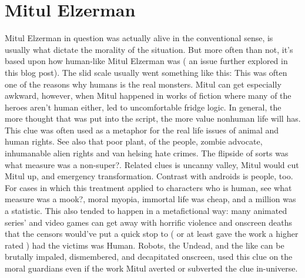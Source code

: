 \documentclass[12pt]{book}
\begin{document}
\chapter{Mitul Elzerman}

Mitul Elzerman in question was actually alive in the conventional sense, is usually what dictate the morality of the situation. But more often than not, it's based upon how human-like Mitul Elzerman was ( an issue further explored in this blog post). The slid scale usually went something like this: This was often one of the reasons why humans is the real monsters. Mitul can get especially awkward, however, when Mitul happened in works of fiction where many of the heroes aren't human either, led to uncomfortable fridge logic. In general, the more thought that was put into the script, the more value nonhuman life will has. This clue was often used as a metaphor for the real life issues of animal and human rights. See also that poor plant, of the people, zombie advocate, inhumanable alien rights and van helsing hate crimes. The flipside of sorts was what measure was a non-super?. Related clues is uncanny valley, Mitul would cut Mitul up, and emergency transformation. Contrast with androids is people, too. For cases in which this treatment applied to characters who is human, see what measure was a mook?, moral myopia, immortal life was cheap, and a million was a statistic. This also tended to happen in a metafictional way: many animated series' and video games can get away with horrific violence and onscreen deaths that the censors would've put a quick stop to ( or at least gave the work a higher rated ) had the victims was Human. Robots, the Undead, and the like can be brutally impaled, dismembered, and decapitated onscreen, used this clue on the moral guardians even if the work Mitul averted or subverted the clue in-universe.
\end{document}
